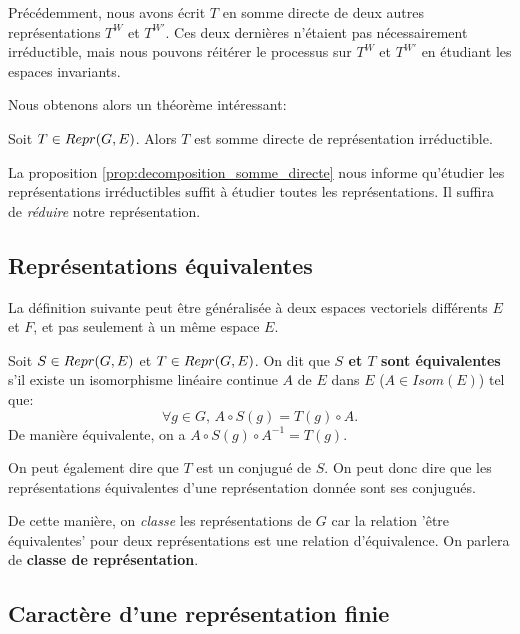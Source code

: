 Précédemment, nous avons écrit $T$ en somme directe de deux autres
représentations $T^{W}$ et $T^{W'}$. Ces deux dernières n'étaient pas nécessairement irréductible,
mais nous pouvons réitérer le processus sur $T^{W}$ et $T^{W'}$ en étudiant les
espaces invariants.

Nous obtenons alors un théorème intéressant:

\begin{proposition}
	\label{prop:decomposition_somme_directe}
	Soit $T \in Repr(G, E)$. Alors $T$ est somme directe de représentation
	irréductible.
\end{proposition}

La proposition \ref{prop:decomposition_somme_directe} nous informe qu'étudier
les représentations irréductibles suffit à étudier toutes les représentations.
Il suffira de \textit{réduire} notre représentation.

\subsection{Représentations équivalentes}

La définition suivante peut être généralisée à deux espaces vectoriels
différents $E$ et $F$, et pas seulement à un même espace $E$.

\begin{definition}
	Soit $S \in Repr(G, E)$ et $T \in Repr(G, E)$.
	On dit que \textbf{$S$ et $T$ sont équivalentes} s'il existe un isomorphisme
	linéaire continue $A$ de $E$ dans $E$ ($A \in Isom(E)$) tel que:
	\begin{equation}
		\forall g \in G, \, A \circ S(g) = T(g) \circ A.
	\end{equation}
	De manière équivalente, on a $A \circ S(g) \circ A^{-1} = T(g)$.

	On peut également dire que $T$ est un conjugué de $S$. On peut donc dire que
	les représentations équivalentes d'une représentation donnée sont ses
	conjugués.
\end{definition}

De cette manière, on \textit{classe} les représentations de $G$ car la
relation 'être équivalentes' pour deux représentations est une relation
d'équivalence. On parlera de \textbf{classe de représentation}.


\subsection{Caractère d'une représentation finie}

